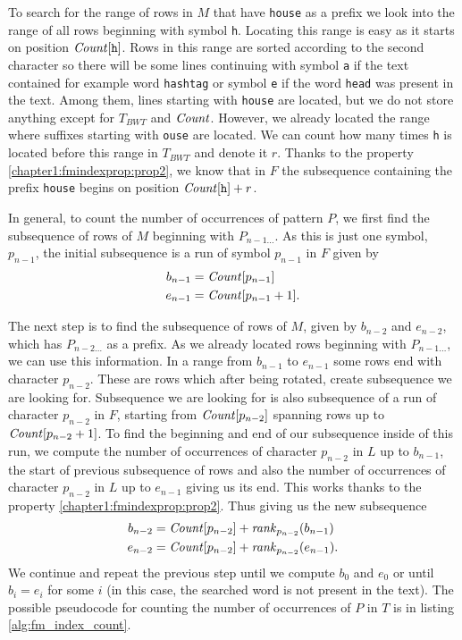 To search for the range of rows in $M$ that have {\tt house} as a prefix we look into the range of all
rows beginning with symbol {\tt h}. Locating this range is easy as it starts on position
$\mathit{Count}[\texttt{h}]$. Rows in this range are sorted according to the second character so there will be
some lines continuing with symbol {\tt a} if the text contained for example word {\tt hashtag} or symbol
{\tt e} if the word {\tt head} was present in the text. Among them, lines starting with {\tt house} are
located, but we do not store anything except for $T_{BWT}$ and $\mathit{Count}$. However, we already located the
range where suffixes starting with {\tt ouse} are located. We can count how many times {\tt h} is located
before this range in $T_{BWT}$ and denote it $r$. Thanks to the property \ref{chapter1:fmindexprop:prop2},
we know that in $F$ the subsequence containing the prefix {\tt house} begins on position $\mathit{Count}[\texttt{h}]+r$.


In general, to count the number of occurrences of pattern $P$, we first find the subsequence of rows of $M$
beginning with $P_{n-1\ldots}$. As this is just one symbol, $p_{n-1}$, the initial subsequence is a run
of symbol $p_{n-1}$ in $F$ given by
\begin{align*}
	b_{n-1}&=\mathit{Count}[p_{n-1}] \\
	e_{n-1}&=\mathit{Count}[p_{n-1}+1].\\
\end{align*}

The next step is to find the subsequence of rows of $M$, given by $b_{n-2}$ and $e_{n-2}$, which has
$P_{n-2\ldots}$ as a prefix. As we already located rows beginning with $P_{n-1\ldots}$, we can use
this information. In a range from $b_{n-1}$ to $e_{n-1}$ some rows end with character $p_{n-2}$. These
are rows which after being rotated, create subsequence we are looking for. Subsequence we are looking
for is also subsequence of a run of character $p_{n-2}$ in $F$, starting from $\mathit{Count}[p_{n-2}]$ spanning
rows up to $\mathit{Count}[p_{n-2}+1]$. To find the beginning and end of our subsequence inside of this run, we
compute the number of occurrences of character $p_{n-2}$ in $L$ up to $b_{n-1}$, the start of previous
subsequence of rows and also the number of occurrences of character $p_{n-2}$ in $L$ up to $e_{n-1}$
giving us its end. This works thanks to the property \ref{chapter1:fmindexprop:prop2}. Thus giving us the
new subsequence
\begin{align*}
	b_{n-2}&=\mathit{Count}[p_{n-2}] + \mathit{rank}_{p_{n-2}}(b_{n-1}) \\
	e_{n-2}&=\mathit{Count}[p_{n-2}] + \mathit{rank}_{p_{n-2}}(e_{n-1}).\\
\end{align*}
We continue and repeat the previous step until we compute $b_0$ and $e_0$ or until $b_i=e_i$ for some $i$
(in this case, the searched word is not present in the text). The possible pseudocode for counting the number
of occurrences of $P$ in $T$ is in listing \ref{alg:fm_index_count}.

